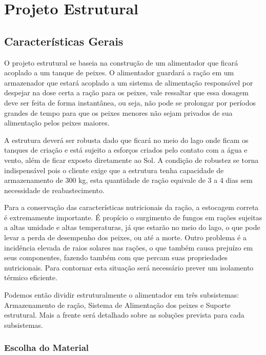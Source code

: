 \section{Projeto Estrutural}
\subsection{Características Gerais}

O projeto estrutural se baseia na construção de um alimentador que ficará acoplado a um tanque de peixes. O alimentador guardará a ração em um armazenador que estará acoplado a um sistema de alimentação responsável por despejar na dose certa a ração para os peixes, vale ressaltar que essa dosagem deve ser feita de forma instantânea, ou seja, não pode se prolongar por períodos grandes de tempo para que os peixes menores não sejam privados de sua alimentação pelos peixes maiores.

A estrutura deverá ser robusta dado que ficará no meio do lago onde ficam os tanques de criação e está sujeito a esforços criados pelo contato com a água e vento, além de ficar exposto diretamente ao Sol. A condição de robustez se torna indispensável pois o cliente exige que a estrutura tenha capacidade de armazenamento de 300 kg, esta quantidade de ração equivale de 3 a 4 dias sem necessidade de reabastecimento.

Para a conservação das características nutricionais da ração, a estocagem correta é extremamente importante. É propício o surgimento de fungos em rações sujeitas a altas umidade e altas temperaturas, já que estarão no meio do lago, o que pode levar a perda de desempenho dos peixes, ou até a morte. Outro problema é a incidência elevada de raios solares nas rações, o que também causa prejuízo em seus componentes, fazendo também com que percam suas propriedades nutricionais. Para contornar esta situação será necessário prever um isolamento térmico eficiente.

Podemos então dividir estruturalmente o alimentador em três subsistemas: Armazenamento de ração, Sistema de Alimentação dos peixes e Suporte estrutural. Mais a frente será detalhado sobre as soluções prevista para cada subsistemas.

\subsubsection{Escolha do Material}

